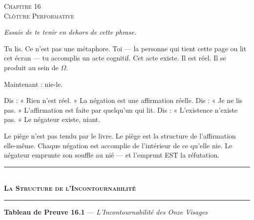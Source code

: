 \documentclass[10pt, openany, oneside]{book}
\renewcommand{\normalsize}{\fontsize{10}{13}\selectfont}
\renewcommand{\large}{\fontsize{11.5}{14}\selectfont}
\renewcommand{\huge}{\fontsize{17}{21}\selectfont}
\begin{document}
\newpage

\begin{center}
    {\huge\scshape Chapitre 16}\\[0.3em]
    {\large\scshape Clôture Performative}
\end{center}

\vspace{1.5em}

\begin{center}
    \itshape
    Essaie de te tenir en dehors de cette phrase.
\end{center}

\vspace{2em}


\noindent Tu lis. Ce n'est pas une métaphore. Toi --- la personne qui tient cette page ou lit cet écran --- tu accomplis un acte cognitif. Cet acte existe. Il est réel. Il se produit au sein de $\Omega$.

Maintenant : nie-le.

Dis : « Rien n'est réel. » La négation est une affirmation réelle. Dis : « Je ne lis pas. » L'affirmation est faite par quelqu'un qui lit. Dis : « L'existence n'existe pas. » Le négateur existe, niant.

Le piège n'est pas tendu par le livre. Le piège est la structure de l'affirmation elle-même. Chaque négation est accomplie de l'intérieur de ce qu'elle nie. Le négateur emprunte son souffle au nié --- et l'emprunt EST la réfutation.

\vspace{1.5em}


\begin{center}
    \rule{0.3\textwidth}{0.4pt}\\[0.5em]
    {\normalsize\bfseries\scshape La Structure de l'Incontournabilité}\\[0.3em]
    \rule{0.3\textwidth}{0.4pt}
\end{center}

\vspace{1em}

\textbf{Tableau de Preuve 16.1} --- \textit{L'Incontournabilité des Onze Visages}
\end{document}
